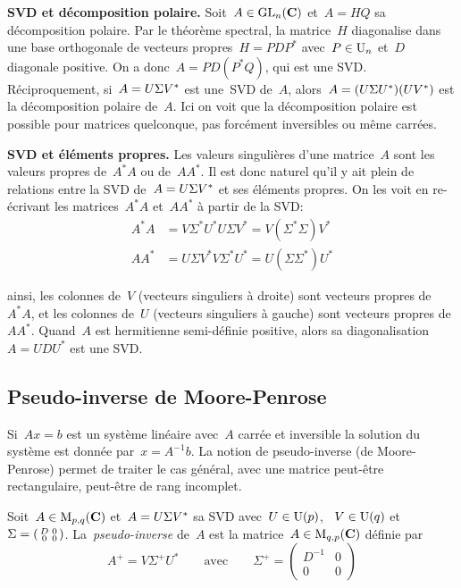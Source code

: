 {\bf SVD et décomposition polaire.}
Soit~$A\in\mathrm{GL}_n(\mathbf{C})$ et~$A=HQ$ sa décomposition polaire.  Par le théorème
spectral, la matrice~$H$ diagonalise dans une base orthogonale de vecteurs
propres~$H=PDP^*$ avec~$P\in\mathrm{U}_n$ et~$D$ diagonale positive.  On a
donc~$A=PD(P^*Q)$, qui est une SVD.
Réciproquement, si~$A=U\/\Sigma V^*$ est une~SVD de~$A$,
alors~$A=(U\/\Sigma U^*)(UV^*)$ est la décomposition polaire de~$A$.  Ici on
voit que la décomposition polaire est possible pour matrices quelconque, pas
forcément inversibles ou même carrées.

{\bf SVD et éléments propres.}
Les valeurs singulières d'une matrice~$A$ sont les valeurs propres de~$A^*A$
ou de~$AA^*$.  Il est donc naturel qu'il y ait plein de relations entre
la SVD de~$A=U\/\Sigma V^*$ et ses éléments propres.  On les voit en re-écrivant
les matrices~$A^*A$ et~$AA^*$ à partir de la SVD:
\begin{align*}
	A^*A & = V\Sigma^*U^* U\Sigma V^* = V(\Sigma^*\Sigma)V^* \\
	AA^* & = U\Sigma V^* V\Sigma^* U^* = U(\Sigma\Sigma^*)U^*
\end{align*}

ainsi, les colonnes de~$V$ (vecteurs singuliers à droite) sont vecteurs
propres de~$A^*A$, et les colonnes de~$U$ (vecteurs singuliers à gauche) sont
vecteurs propres de~$AA^*$.
Quand~$A$ est hermitienne semi-définie positive, alors sa
diagonalisation~$A=UDU^*$ est une SVD.


\subsection{Pseudo-inverse de Moore-Penrose}

Si~$Ax=b$ est un système linéaire avec~$A$ carrée et inversible la solution
du système est donnée par~$x=A^{-1}b$.  La notion de pseudo-inverse (de
Moore-Penrose) permet de traiter le cas général, avec une matrice peut-être
rectangulaire, peut-être de rang incomplet.

\begin{definition}
	\label{def:pseudoinv}
	Soit~$A\in\mathrm{M}_{p,q}(\mathbf{C})$ et~$A=U\/\Sigma V^*$ sa SVD
	avec~$U\in\mathrm{U}(p)$, ~$V\in\mathrm{U}(q)$
	et~$\Sigma=\left(\begin{smallmatrix}D&0\\0&0\end{smallmatrix}\right)$.
	La~\emph{pseudo-inverse} de~$A$ est la matrice~$A\in\mathrm{M}_{q,p}(\mathbf{C})$ définie
	par
	\[
		A^+=V\Sigma^+ U^*
		\qquad
		\textrm{avec}
		\qquad
		\Sigma^+=\begin{pmatrix}D^{-1}&0\\0&0\end{pmatrix}
	\]
\end{definition}


